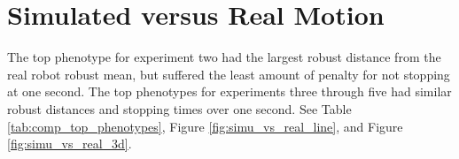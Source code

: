

\newpage

\section{Simulated versus Real Motion}
\label{sec:sim_vs_real_mot}

The top phenotype for experiment two had the largest robust distance from the real robot robust mean, but suffered the least amount of penalty for not stopping at one second. The top phenotypes for experiments three through five had similar robust distances and stopping times over one second. See Table \ref{tab:comp_top_phenotypes}, Figure \ref{fig:simu_vs_real_line}, and Figure \ref{fig:simu_vs_real_3d}. 

